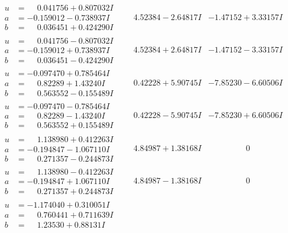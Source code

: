\documentclass[1p]{elsarticle_modified}
\theoremstyle{definition}
\begin{document}
$$\begin{array}{c|c|c}
\begin{aligned}
u &= \phantom{-}0.041756 + 0.807032 I \\
a &= -0.159012 - 0.738937 I \\
b &= \phantom{-}0.036451 + 0.424290 I\end{aligned}
 & \phantom{-}4.52384 - 2.64817 I & -1.47152 + 3.33157 I \\ \hline\begin{aligned}
u &= \phantom{-}0.041756 - 0.807032 I \\
a &= -0.159012 + 0.738937 I \\
b &= \phantom{-}0.036451 - 0.424290 I\end{aligned}
 & \phantom{-}4.52384 + 2.64817 I & -1.47152 - 3.33157 I \\ \hline\begin{aligned}
u &= -0.097470 + 0.785464 I \\
a &= \phantom{-}0.82289 + 1.43240 I \\
b &= \phantom{-}0.563552 - 0.155489 I\end{aligned}
 & \phantom{-}0.42228 + 5.90745 I & -7.85230 - 6.60506 I \\ \hline\begin{aligned}
u &= -0.097470 - 0.785464 I \\
a &= \phantom{-}0.82289 - 1.43240 I \\
b &= \phantom{-}0.563552 + 0.155489 I\end{aligned}
 & \phantom{-}0.42228 - 5.90745 I & -7.85230 + 6.60506 I \\ \hline\begin{aligned}
u &= \phantom{-}1.138980 + 0.412263 I \\
a &= -0.194847 - 1.067110 I \\
b &= \phantom{-}0.271357 - 0.244873 I\end{aligned}
 & \phantom{-}4.84987 + 1.38168 I & \phantom{-0.000000 } 0 \\ \hline\begin{aligned}
u &= \phantom{-}1.138980 - 0.412263 I \\
a &= -0.194847 + 1.067110 I \\
b &= \phantom{-}0.271357 + 0.244873 I\end{aligned}
 & \phantom{-}4.84987 - 1.38168 I & \phantom{-0.000000 } 0 \\ \hline\begin{aligned}
u &= -1.174040 + 0.310051 I \\
a &= \phantom{-}0.760441 + 0.711639 I \\
b &= \phantom{-}1.23530 + 0.88131 I\end{aligned}

\end{array}$$
\end{document}
